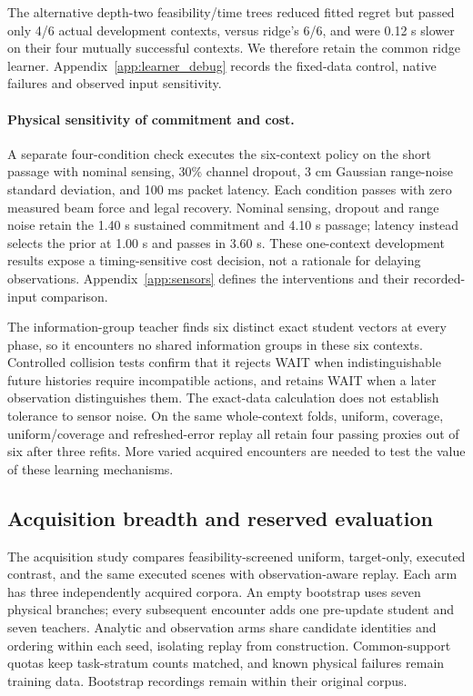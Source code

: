 \documentclass[10pt]{article}
\begin{document}
The alternative depth-two feasibility/time trees reduced fitted regret but
passed only 4/6 actual development contexts, versus ridge's 6/6, and were
0.12 s slower on their four mutually successful contexts. We therefore retain
the common ridge learner. Appendix~\ref{app:learner_debug} records the fixed-data
control, native failures and observed input sensitivity.

\paragraph{Physical sensitivity of commitment and cost.}
A separate four-condition check executes the six-context policy on the short
passage with nominal sensing, 30\% channel dropout, 3 cm Gaussian range-noise
standard deviation, and 100 ms packet latency. Each condition passes with zero
measured beam force and legal recovery. Nominal sensing, dropout and range noise
retain the 1.40 s sustained commitment and 4.10 s passage; latency instead
selects the prior at 1.00 s and passes in 3.60 s. These one-context development
results expose a timing-sensitive cost decision, not a rationale for delaying
observations. Appendix~\ref{app:sensors} defines the interventions and their
recorded-input comparison.

The information-group teacher finds six distinct exact student vectors at every
phase, so it encounters no shared information groups in these six contexts.
Controlled collision tests confirm that it rejects WAIT when indistinguishable
future histories require incompatible actions, and retains WAIT when a later
observation distinguishes them. The exact-data calculation does not establish
tolerance to sensor noise. On the same whole-context folds, uniform, coverage,
uniform/coverage and refreshed-error replay all retain four passing proxies out
of six after three refits. More varied acquired encounters are needed to test
the value of these learning mechanisms.

\subsection{Acquisition breadth and reserved evaluation}
The acquisition study compares feasibility-screened uniform, target-only,
executed contrast, and the same executed scenes with observation-aware replay.
Each arm has three independently acquired corpora. An empty bootstrap uses
seven physical branches; every subsequent encounter adds one pre-update student
and seven teachers. Analytic and observation arms share candidate identities and
ordering within each seed, isolating replay from construction. Common-support
quotas keep task-stratum counts matched, and known physical failures remain
training data. Bootstrap recordings remain within their original corpus.
\end{document}
